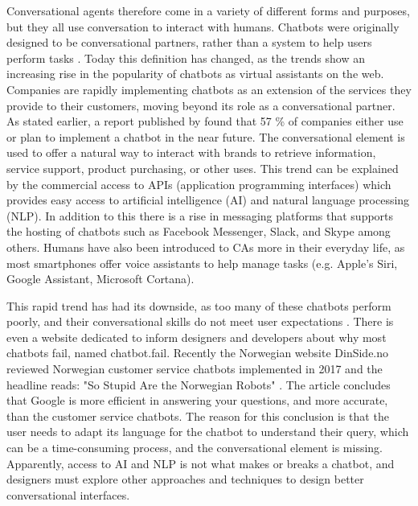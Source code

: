 Conversational agents therefore come in a variety of different forms and purposes, but they all use conversation to interact with humans. Chatbots were originally designed to be conversational partners, rather than a system to help users perform tasks \citep{McTear2016}. Today this definition has changed, as the trends show an increasing rise in the popularity of chatbots as virtual assistants on the web. Companies are rapidly implementing chatbots as an extension of the services they provide to their customers, moving beyond its role as a conversational partner. As stated earlier, a report published by \cite{forrester2017} found that 57 \% of companies either use or plan to implement a chatbot in the near future. The conversational element is used to offer a natural way to interact with brands to retrieve information, service support, product purchasing, or other uses. This trend can be explained by the commercial access to APIs (application programming interfaces) which provides easy access to artificial intelligence (AI) and natural language processing (NLP). In addition to this there is a rise in messaging platforms that supports the hosting of chatbots such as Facebook Messenger, Slack, and Skype among others. Humans have also been introduced to CAs more in their everyday life, as most smartphones offer voice assistants to help manage tasks (e.g. Apple's Siri, Google Assistant, Microsoft Cortana).

This rapid trend has had its downside, as too many of these chatbots perform poorly, and their conversational skills do not meet user expectations \citep{stokke2017,boutin2017}. There is even a website dedicated to inform designers and developers about why most chatbots fail, named chatbot.fail. Recently the Norwegian website DinSide.no reviewed Norwegian customer service chatbots implemented in 2017 and the headline reads: "So Stupid Are the Norwegian Robots" \cite{stokke2017}. The article concludes that Google is more efficient in answering your questions, and more accurate, than the customer service chatbots. The reason for this conclusion is that the user needs to adapt its language for the chatbot to understand their query, which can be a time-consuming process, and the conversational element is missing. Apparently, access to AI and NLP is not what makes or breaks a chatbot, and designers must explore other approaches and techniques to design better conversational interfaces.

\vspace{5mm} %

